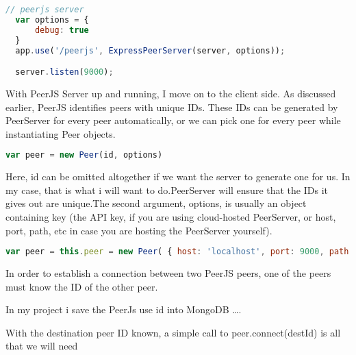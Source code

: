 \begin{lstlisting}[language=javascript]
// peerjs server
  var options = {
      debug: true
  }
  app.use('/peerjs', ExpressPeerServer(server, options));

  server.listen(9000);
\end{lstlisting}


With PeerJS Server up and running, I move on to the client side. As discussed earlier, PeerJS identifies peers with unique IDs. These IDs can be generated by PeerServer for every peer automatically, or we can pick one for every peer while instantiating Peer objects.

\begin{lstlisting}[language=javascript]
var peer = new Peer(id, options)
\end{lstlisting}

Here, id can be omitted altogether if we want the server to generate one for us. In my case, that is what i will want to do.PeerServer will ensure that the IDs it gives out are unique.The second argument, options, is usually an object containing key (the API key, if you are using cloud-hosted PeerServer, or host, port, path, etc in case you are hosting the PeerServer yourself).

\begin{lstlisting}[language=javascript]
var peer = this.peer = new Peer( { host: 'localhost', port: 9000, path: '/peerjs'});
\end{lstlisting}

In order to establish a connection between two PeerJS peers, one of the peers must know the ID of the other peer.

In my project i save the PeerJs use id into MongoDB ….


 With the destination peer ID known, a simple call to peer.connect(destId) is all that we will need
